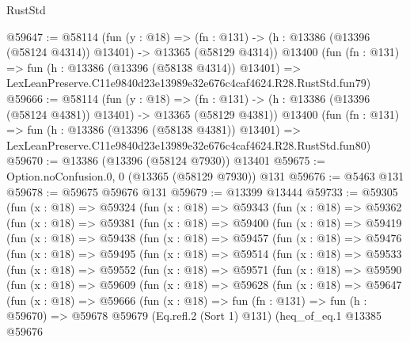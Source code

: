 \begin{lexlean}{RustStd}
\begin{coremodule}
@59647 := @58114
    (fun (y : @18) =>
    (fn : @131) -> (h : @13386 (@13396 (@58124 @4314)) @13401) -> @13365 (@58129 @4314))
    @13400
    (fun (fn : @131) =>
    fun (h : @13386 (@13396 (@58138 @4314)) @13401) =>
    LexLeanPreserve.C11e9840d23e13989e32e676c4caf4624.R28.RustStd.fun79)
@59666 := @58114
    (fun (y : @18) =>
    (fn : @131) -> (h : @13386 (@13396 (@58124 @4381)) @13401) -> @13365 (@58129 @4381))
    @13400
    (fun (fn : @131) =>
    fun (h : @13386 (@13396 (@58138 @4381)) @13401) =>
    LexLeanPreserve.C11e9840d23e13989e32e676c4caf4624.R28.RustStd.fun80)
@59670 := @13386 (@13396 (@58124 @7930)) @13401
@59675 := Option.noConfusion.{0, 0} (@13365 (@58129 @7930)) @131
@59676 := @5463 @131
@59678 := @59675 @59676 @131
@59679 := @13399 @13444
@59733 := @59305
    (fun (x : @18) =>
    @59324
      (fun (x : @18) =>
      @59343
        (fun (x : @18) =>
        @59362
          (fun (x : @18) =>
          @59381
            (fun (x : @18) =>
            @59400
              (fun (x : @18) =>
              @59419
                (fun (x : @18) =>
                @59438
                  (fun (x : @18) =>
                  @59457
                    (fun (x : @18) =>
                    @59476
                      (fun (x : @18) =>
                      @59495
                        (fun (x : @18) =>
                        @59514
                          (fun (x : @18) =>
                          @59533
                            (fun (x : @18) =>
                            @59552
                              (fun (x : @18) =>
                              @59571
                                (fun (x : @18) =>
                                @59590
                                  (fun (x : @18) =>
                                  @59609
                                    (fun (x : @18) =>
                                    @59628
                                      (fun (x : @18) =>
                                      @59647
                                        (fun (x : @18) =>
                                        @59666
                                          (fun (x : @18) =>
                                          fun (fn : @131) =>
                                          fun (h : @59670) =>
                                          @59678
                                            @59679
                                            (Eq.refl.{2} (Sort 1) @131)
                                            (heq_of_eq.{1}
                                              @13385
                                              @59676

\end{coremodule}
\end{lexlean}
